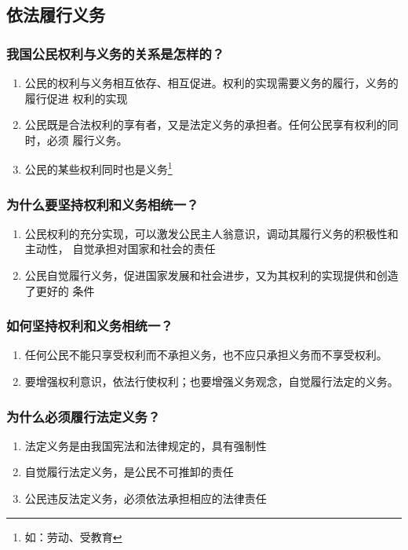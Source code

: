 \documentclass[11pt]{article}
\begin{document}
\subsection{依法履行义务}
\label{sec:org6a30a83}
\subsubsection{我国公民权利与义务的关系是怎样的？}
\label{sec:org2161330}
\begin{enumerate}
\item 公民的权利与义务相互依存、相互促进。权利的实现需要义务的履行，义务的履行促进
权利的实现
\item 公民既是合法权利的享有者，又是法定义务的承担者。任何公民享有权利的同时，必须
履行义务。
\item 公民的某些权利同时也是义务\footnote{如：劳动、受教育}
\end{enumerate}
\subsubsection{为什么要坚持权利和义务相统一？}
\label{sec:orgdecd04c}
\begin{enumerate}
\item 公民权利的充分实现，可以激发公民主人翁意识，调动其履行义务的积极性和主动性，
自觉承担对国家和社会的责任
\item 公民自觉履行义务，促进国家发展和社会进步，又为其权利的实现提供和创造了更好的
条件
\end{enumerate}
\subsubsection{如何坚持权利和义务相统一？}
\label{sec:org57ab29b}
\begin{enumerate}
\item 任何公民不能只享受权利而不承担义务，也不应只承担义务而不享受权利。
\item 要增强权利意识，依法行使权利；也要增强义务观念，自觉履行法定的义务。
\end{enumerate}
\subsubsection{为什么必须履行法定义务？}
\label{sec:orgc53b752}
\begin{enumerate}
\item 法定义务是由我国宪法和法律规定的，具有强制性
\item 自觉履行法定义务，是公民不可推卸的责任
\item 公民违反法定义务，必须依法承担相应的法律责任
\end{enumerate}
\end{document}
